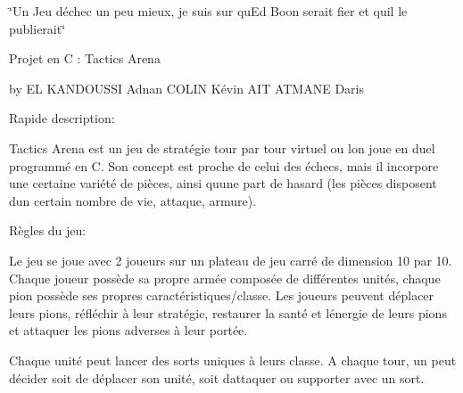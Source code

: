\char`\"{}\+Un Jeu d\textquotesingle{}échec un peu mieux, je suis sur qu\textquotesingle{}\+Ed Boon serait fier et qu\textquotesingle{}il le publierait\char`\"{}

Projet en C \+: Tactics Arena

by EL K\+A\+N\+D\+O\+U\+S\+SI Adnan C\+O\+L\+IN Kévin A\+IT A\+T\+M\+A\+NE Daris

Rapide description\+:

Tactics Arena est un jeu de stratégie tour par tour virtuel ou l\textquotesingle{}on joue en duel programmé en C. Son concept est proche de celui des échecs, mais il incorpore une certaine variété de pièces, ainsi qu\textquotesingle{}une part de hasard (les pièces disposent d\textquotesingle{}un certain nombre de vie, attaque, armure).

Règles du jeu\+:

Le jeu se joue avec 2 joueurs sur un plateau de jeu carré de dimension 10 par 10. Chaque joueur possède sa propre armée composée de différentes unités, chaque pion possède ses propres caractéristiques/classe. Les joueurs peuvent déplacer leurs pions, réfléchir à leur stratégie, restaurer la santé et l\textquotesingle{}énergie de leurs pions et attaquer les pions adverses à leur portée.

Chaque unité peut lancer des sorts uniques à leurs classe. A chaque tour, un peut décider soit de déplacer son unité, soit d\textquotesingle{}attaquer ou supporter avec un sort. 